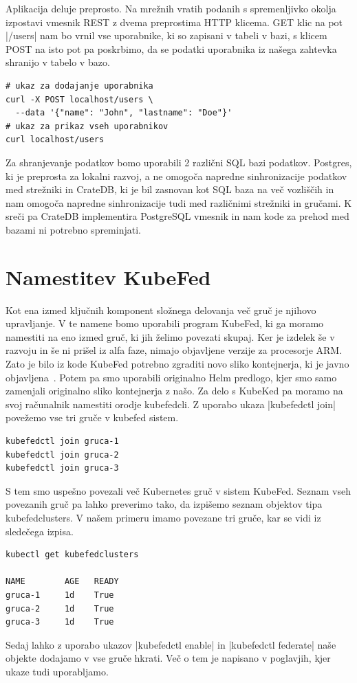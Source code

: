 \documentclass[a4paper, 12pt]{book}
\begin{document}
Aplikacija deluje preprosto.
Na mrežnih vratih podanih s spremenljivko okolja izpostavi vmesnik REST z dvema preprostima HTTP klicema.
GET klic na pot \spverb|/users| nam bo vrnil vse uporabnike, ki so zapisani v tabeli v bazi, s klicem POST na isto pot pa poskrbimo, da se podatki uporabnika iz našega zahtevka shranijo v tabelo v bazo.
\begin{verbatim}
# ukaz za dodajanje uporabnika
curl -X POST localhost/users \
  --data '{"name": "John", "lastname": "Doe"}'
# ukaz za prikaz vseh uporabnikov
curl localhost/users
\end{verbatim}

Za shranjevanje podatkov bomo uporabili 2 različni SQL bazi podatkov.
Postgres, ki je preprosta za lokalni razvoj, a ne omogoča napredne sinhronizacije podatkov med strežniki in CrateDB, ki je bil zasnovan kot SQL baza na več vozliščih in nam omogoča napredne sinhronizacije tudi med različnimi strežniki in gručami.
K sreči pa CrateDB implementira PostgreSQL vmesnik in nam kode za prehod med bazami ni potrebno spreminjati.
\section{Namestitev KubeFed}
Kot ena izmed ključnih komponent složnega delovanja več gruč je njihovo upravljanje.
V te namene bomo uporabili program KubeFed, ki ga moramo namestiti na eno izmed gruč, ki jih želimo povezati skupaj.
Ker je izdelek še v razvoju in še ni prišel iz alfa faze, nimajo objavljene verzije za procesorje ARM.
Zato je bilo iz kode KubeFed potrebno zgraditi novo sliko kontejnerja, ki je javno objavljena~\cite{docker-kubefed}.
Potem pa smo uporabili originalno Helm predlogo, kjer smo samo zamenjali originalno sliko kontejnerja z našo.
Za delo s KubeKed pa moramo na svoj računalnik namestiti orodje kubefedcli.
Z uporabo ukaza \spverb|kubefedctl join| povežemo vse tri gruče v kubefed sistem.
\begin{verbatim}
kubefedctl join gruca-1
kubefedctl join gruca-2
kubefedctl join gruca-3
\end{verbatim}
S tem smo uspešno povezali več Kubernetes gruč v sistem KubeFed.
Seznam vseh povezanih gruč pa lahko preverimo tako, da izpišemo seznam objektov tipa kubefedclusters. 
V našem primeru imamo povezane tri gruče, kar se vidi iz sledečega izpisa.
\begin{verbatim}
kubectl get kubefedclusters

NAME        AGE   READY
gruca-1     1d    True
gruca-2     1d    True
gruca-3     1d    True
\end{verbatim}
Sedaj lahko z uporabo ukazov \spverb|kubefedctl enable| in \spverb|kubefedctl federate| naše objekte dodajamo v vse gruče hkrati.
Več o tem je napisano v poglavjih, kjer ukaze tudi uporabljamo.
\end{document}
